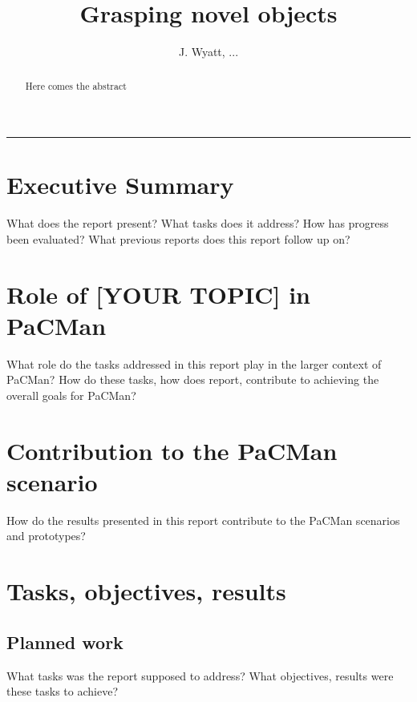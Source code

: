 \documentclass[a4paper,11pt,pdf]{pacmanreport}
\title{Grasping novel objects}
\author{J. Wyatt, ...}
\begin{document}
\maketitle

\begin{abstract}
\noindent Here comes the abstract
\end{abstract}


\vspace{.2em}
\hrule

\footnotesize

\tableofcontents

\normalsize

\newpage

\section*{Executive Summary}

What does the report present? What tasks does it address? How has progress been evaluated? What previous reports does this report follow up on? 

\section*{Role of [YOUR TOPIC] in PaCMan}

What role do the tasks addressed in this report play in the larger context of PaCMan? How do these tasks, how does report, contribute to achieving the overall goals for PaCMan? 

\section*{Contribution to the PaCMan scenario}

How do the results presented in this report contribute to the PaCMan\cite{ProjectWebsite} scenarios and prototypes? 


\newpage

\section{Tasks, objectives, results}

\subsection{Planned work}

What tasks was the report supposed to address? What objectives, results were these tasks to achieve? 
\end{document}
